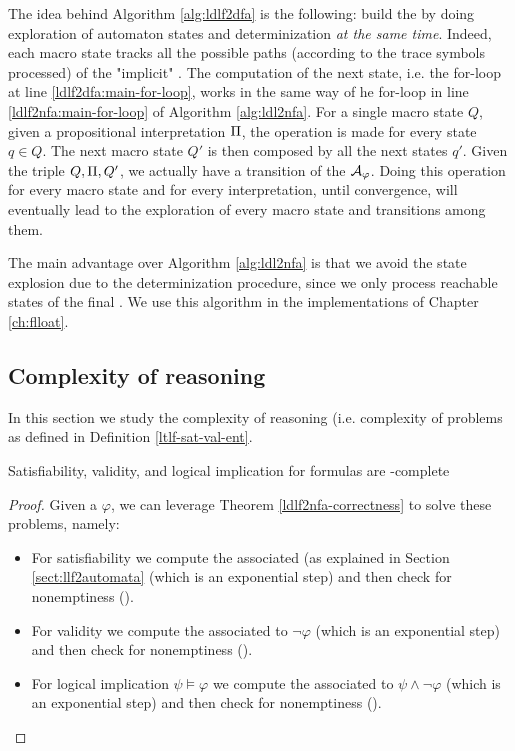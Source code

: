 The idea behind Algorithm \ref{alg:ldlf2dfa} is the following: build the \DFA by doing exploration of automaton states and determinization \emph{at the same time}. Indeed, each macro state tracks all the  possible paths (according to the trace symbols processed) of the "implicit" \NFA. The computation of the next \NFA state, i.e. the for-loop at line \ref{ldlf2dfa:main-for-loop}, works in the same way of he for-loop in line \ref{ldlf2nfa:main-for-loop} of Algorithm \ref{alg:ldl2nfa}. For a single macro state $Q$, given a propositional interpretation $\Pi$, the operation is made for every \NFA state $q\in Q$. The next macro state $Q'$ is then composed by all the next \NFA states $q'$. Given the triple $Q, \Pi, Q'$, we actually have a transition of the \DFA $\mathcal{A}_\varphi$. Doing this operation for every macro state and for every interpretation, until convergence, will eventually lead to the exploration of every macro state and transitions among them. 

The main advantage over Algorithm \ref{alg:ldl2nfa} is that we avoid the state explosion due to the determinization procedure, since we only process reachable states of the final \DFA. We use this algorithm in the implementations of Chapter \ref{ch:flloat}.

\subsection{Complexity of \LLf reasoning}
In this section we study the complexity of \LLf reasoning (i.e. complexity of problems as defined in Definition \ref{ltlf-sat-val-ent}.

\begin{theorem} Satisfiability, validity, and logical implication for \LDLf formulas are \PSPACE-complete
\end{theorem}
\begin{proof}
	Given a \LLf $\varphi$, we can leverage Theorem \ref{ldlf2nfa-correctness} to solve these problems, namely:
	\begin{itemize}
		\item For \LLf satisfiability we compute the associated \NFA (as explained in Section \ref{sect:llf2automata} (which is an exponential step) and then check \NFA for nonemptiness (\NLOGSPACE).
		\item For \LLf validity we compute the \NFA associated to $\lnot \varphi$ (which is an exponential step) and then check \NFA for nonemptiness (\NLOGSPACE).
		\item For \LLf logical implication $\psi \models \varphi$ we compute the \NFA associated to $\psi \wedge \lnot \varphi$ (which is an exponential step) and then check \NFA for nonemptiness (\NLOGSPACE).
	\end{itemize}
\end{proof}

